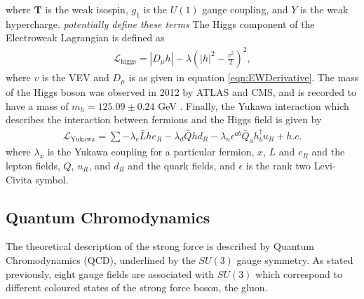 \documentclass[12pt, oneside]{article}   	%
\begin{document}
where $\textbf{T}$ is the weak isospin, $g_{1}$ is the $U(1)$ gauge coupling, and $Y$ is the weak hypercharge. \textit{potentially define these terms}
The Higgs component of the Electroweak Lagrangian is defined as 
\begin{align}
\mathcal{L}_{\textrm{higgs}} = \left| D_{\mu} h \right| -\lambda \left( \left| h \right|^{2} - \frac{v^{2}}{2} \right)^{2},
\end{align}
where $v$ is the VEV and $D_{\mu}$ is as given in equation \ref{eqn:EWDerivative}. 
The mass of the Higgs boson was observed in 2012 by ATLAS and CMS, and is recorded to have a mass of $m_{h} = 125.09 \pm 0.24$ GeV \cite{aad2012observation, chatrchyan2012observation}.
Finally, the Yukawa interaction which describes the interaction between fermions and the Higgs field is given by
\begin{align}
\mathcal{L}_{\textrm{Yukawa}} = \sum -\lambda_{e} \bar{L} h e_{R} - \lambda_{d} \bar{Q} h d_{R} - \lambda_{u} \epsilon^{ab}\bar{Q}_{a} h^{\dagger}_{b} u_{R} + h.c.
\end{align}
where $\lambda_{x}$ is the Yukawa coupling for a particular fermion, $x$, $L$ and $e_{R}$ and the lepton fields, $Q$, $u_{R}$, and $d_{R}$ and the quark fields, and $\epsilon$ is the rank two Levi-Civita symbol.

\subsection{Quantum Chromodynamics}
The theoretical description of the strong force is described by Quantum Chromodynamics (QCD), underlined by the $SU(3)$ gauge symmetry. 
As stated previously, eight gauge fields are associated with $SU(3)$ which correspond to different coloured states of the strong force boson, the gluon.
\end{document}
